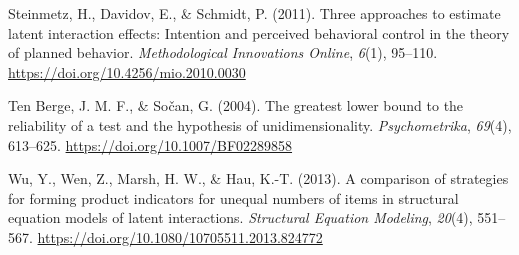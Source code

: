 \documentclass[
  man]{apa6}
\newlength{\cslhangindent}
\newenvironment{CSLReferences}[2] %
 {\begin{list}{}{%
  \setlength{\itemindent}{0pt}
  \setlength{\leftmargin}{0pt}
  \setlength{\parsep}{0pt}
  \ifodd #1
   \setlength{\leftmargin}{\cslhangindent}
   \setlength{\itemindent}{-1\cslhangindent}
  \fi
  \setlength{\itemsep}{#2\baselineskip}}}
 {\end{list}}
\begin{document}
\begin{CSLReferences}{1}{0}
Steinmetz, H., Davidov, E., \& Schmidt, P. (2011). Three approaches to estimate latent interaction effects: {Intention} and perceived behavioral control in the theory of planned behavior. \emph{Methodological Innovations Online}, \emph{6}(1), 95--110. \url{https://doi.org/10.4256/mio.2010.0030}

Ten Berge, J. M. F., \& Sočan, G. (2004). The greatest lower bound to the reliability of a test and the hypothesis of unidimensionality. \emph{Psychometrika}, \emph{69}(4), 613--625. \url{https://doi.org/10.1007/BF02289858}

Wu, Y., Wen, Z., Marsh, H. W., \& Hau, K.-T. (2013). A comparison of strategies for forming product indicators for unequal numbers of items in structural equation models of latent interactions. \emph{Structural Equation Modeling}, \emph{20}(4), 551--567. \url{https://doi.org/10.1080/10705511.2013.824772}

\end{CSLReferences}
\end{document}
